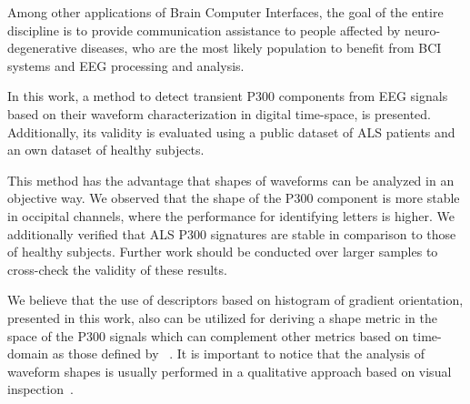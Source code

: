 \documentclass[utf8]{frontiersSCNS} %
\begin{document}



Among other applications of Brain Computer Interfaces, the goal of the entire discipline is to provide communication assistance to people affected by neuro-degenerative diseases, who are the most likely population to benefit from BCI systems and EEG processing and analysis.

In this work, a method to detect transient P300 components from EEG signals based on their waveform characterization in digital time-space, is presented.  Additionally, its validity is evaluated using a public dataset of ALS patients and an own dataset of healthy subjects. 


This method has the advantage that shapes of waveforms can be analyzed in an objective way.  We observed that the shape of the P300 component is more stable in occipital channels, where the performance for identifying letters is higher.   We additionally verified that ALS P300 signatures are stable in comparison to those of healthy subjects.  Further work should be conducted over larger samples to cross-check the validity of these results.

We believe that the use of descriptors based on histogram of gradient orientation, presented in this work, also can be utilized for deriving a shape metric in the space of the P300 signals which can complement other metrics based on time-domain as those defined by ~\cite{Mak2012}. It is important to notice that the analysis of waveform shapes is usually performed in a qualitative approach based on visual inspection~\citep{SellersandEmanuelDonchin2006}.
\end{document}
